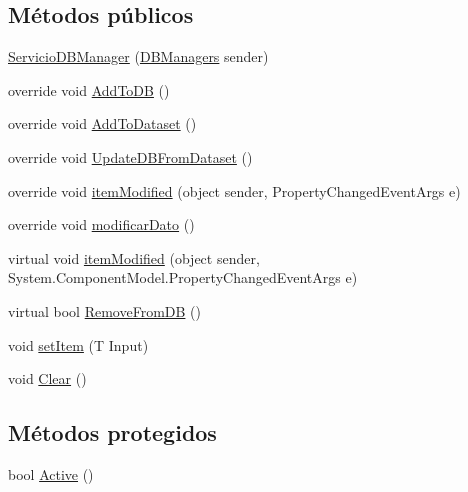 \subsection*{Métodos públicos}
\begin{DoxyCompactItemize}
\item 
\hyperlink{class_proyecto___integrador__3_1_1_d_b_managers_1_1_servicio_d_b_manager_a409f1159870ced1800ab4ac735a94f72}{Servicio\-D\-B\-Manager} (\hyperlink{class_proyecto___integrador__3_1_1_d_b_managers}{D\-B\-Managers} sender)
\item 
override void \hyperlink{class_proyecto___integrador__3_1_1_d_b_managers_1_1_servicio_d_b_manager_abbc936c9fa59cae0fc302c44e6389876}{Add\-To\-D\-B} ()
\item 
override void \hyperlink{class_proyecto___integrador__3_1_1_d_b_managers_1_1_servicio_d_b_manager_a6da7980b7551fb67526270a28b7e3d35}{Add\-To\-Dataset} ()
\item 
override void \hyperlink{class_proyecto___integrador__3_1_1_d_b_managers_1_1_servicio_d_b_manager_a2ff2e7d573e60b876f4b183defc8675f}{Update\-D\-B\-From\-Dataset} ()
\item 
override void \hyperlink{class_proyecto___integrador__3_1_1_d_b_managers_1_1_servicio_d_b_manager_a2cf0e8f950669e7085314e8213b69d3e}{item\-Modified} (object sender, Property\-Changed\-Event\-Args e)
\item 
override void \hyperlink{class_proyecto___integrador__3_1_1_d_b_managers_1_1_servicio_d_b_manager_a903bee917e813d25c2e9a4ad87281db4}{modificar\-Dato} ()
\item 
virtual void \hyperlink{class_proyecto___integrador__3_1_1_d_b_managers_1_1_d_b_manager_3_01_t_01_4_a49ea2a7bfa58a2c536fefa4d60d488d2}{item\-Modified} (object sender, System.\-Component\-Model.\-Property\-Changed\-Event\-Args e)
\item 
virtual bool \hyperlink{class_proyecto___integrador__3_1_1_d_b_managers_1_1_d_b_manager_3_01_t_01_4_a436cb08914ca84122f9019a59485589a}{Remove\-From\-D\-B} ()
\item 
void \hyperlink{class_proyecto___integrador__3_1_1_d_b_managers_1_1_d_b_manager_3_01_t_01_4_a2d552a5e547efd19924ca4a96f685a56}{set\-Item} (T Input)
\item 
void \hyperlink{class_proyecto___integrador__3_1_1_d_b_managers_1_1_d_b_manager_3_01_t_01_4_ad5d7f99a4a5783514bad64ba8894e1ea}{Clear} ()
\end{DoxyCompactItemize}
\subsection*{Métodos protegidos}
\begin{DoxyCompactItemize}
\item 
bool \hyperlink{class_proyecto___integrador__3_1_1_d_b_managers_1_1_d_b_manager_3_01_t_01_4_add66e324cef43fd10b491bc697fa60b5}{Active} ()
\end{DoxyCompactItemize}
